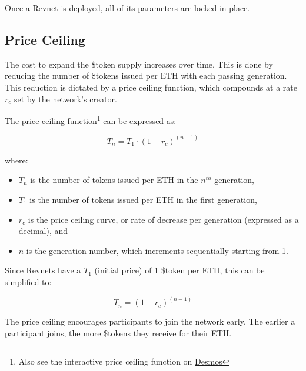 \documentclass{article}
\begin{document}
Once a Revnet is deployed, all of its parameters are locked in place.

\subsection{Price Ceiling}

The cost to expand the \$token supply increases over time. This is done by reducing the number of \$tokens issued per ETH with each passing generation. This reduction is dictated by a price ceiling function, which compounds at a rate $r_c$ set by the network's creator.

The price ceiling function\footnote{Also see the interactive price ceiling function on \href{https://www.desmos.com/calculator/ey9fhuslwe}{Desmos}} can be expressed as:

\begin{equation}
  T_n = T_1 \cdot (1 - r_c)^{(n - 1)}
\end{equation}

where:
\begin{itemize}
  \item $T_n$ is the number of tokens issued per ETH in the $n^{th}$ generation,
  \item $T_1$ is the number of tokens issued per ETH in the first generation,
  \item $r_c$ is the price ceiling curve, or rate of decrease per generation (expressed as a decimal), and
  \item $n$ is the generation number, which increments sequentially starting from 1.
\end{itemize}

Since Revnets have a $T_1$ (initial price) of 1 \$token per ETH, this can be simplified to:

\begin{equation}
  T_n = (1 - r_c)^{(n - 1)}
\end{equation}

The price ceiling encourages participants to join the network early. The earlier a participant joins, the more \$tokens they receive for their ETH.
\end{document}
